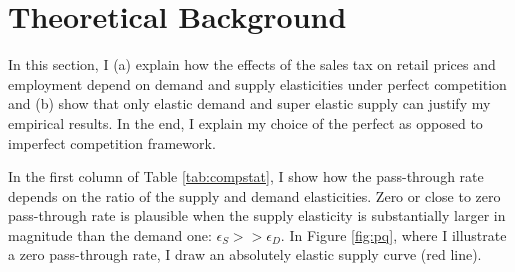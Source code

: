 \documentclass[12pt]{article}
\begin{document}
		
	

			\section{Theoretical Background}
			\label{sec:model}
			
			
			
			In this section, I (a) explain how the effects of the sales tax on retail prices and employment depend on demand and supply elasticities under perfect competition and (b) show that only elastic demand and super elastic supply can justify my empirical results. In the end, I explain my choice of the perfect as opposed to imperfect competition framework.
			
			In the first column of Table \ref{tab:compstat}, I show how the pass-through rate depends on the ratio of the supply and demand elasticities. Zero or close to zero pass-through rate is plausible when the supply elasticity is substantially larger in magnitude than the demand one: $\epsilon_S>>\epsilon_D$. In Figure \ref{fig:pq}, where I illustrate a zero pass-through rate, I draw an absolutely elastic supply curve (red line). 
			
\end{document}
